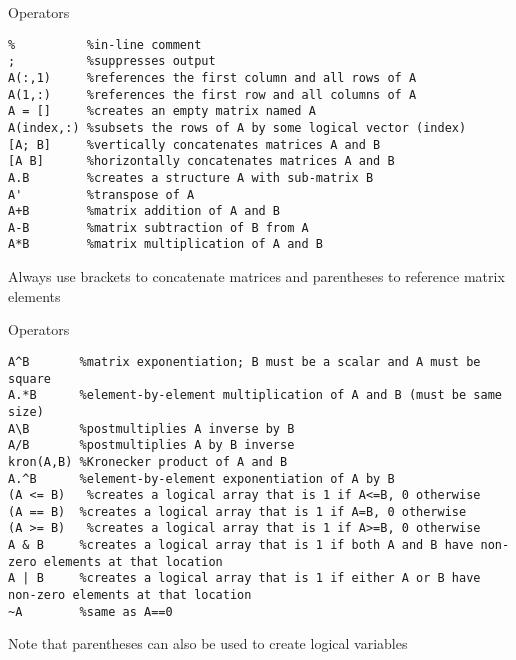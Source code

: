 \documentclass[english,xcolor=dvipsnames]{beamer}
\begin{document}
\begin{frame}[fragile]{Operators}
\begin{lstlisting}
%          %in-line comment
;          %suppresses output
A(:,1)     %references the first column and all rows of A
A(1,:)     %references the first row and all columns of A
A = []     %creates an empty matrix named A
A(index,:) %subsets the rows of A by some logical vector (index)
[A; B]     %vertically concatenates matrices A and B
[A B]      %horizontally concatenates matrices A and B
A.B        %creates a structure A with sub-matrix B
A'         %transpose of A
A+B        %matrix addition of A and B
A-B        %matrix subtraction of B from A
A*B        %matrix multiplication of A and B
\end{lstlisting}
Always use brackets to concatenate matrices and parentheses to reference matrix elements
\end{frame}

\begin{frame}[fragile]{Operators}
\begin{lstlisting}
A^B       %matrix exponentiation; B must be a scalar and A must be square
A.*B      %element-by-element multiplication of A and B (must be same size)
A\B       %postmultiplies A inverse by B
A/B       %postmultiplies A by B inverse
kron(A,B) %Kronecker product of A and B
A.^B      %element-by-element exponentiation of A by B
(A <= B)   %creates a logical array that is 1 if A<=B, 0 otherwise
(A == B)  %creates a logical array that is 1 if A=B, 0 otherwise
(A >= B)   %creates a logical array that is 1 if A>=B, 0 otherwise
A & B     %creates a logical array that is 1 if both A and B have non-zero elements at that location
A | B     %creates a logical array that is 1 if either A or B have non-zero elements at that location
~A        %same as A==0
\end{lstlisting}
Note that parentheses can also be used to create logical variables
\end{frame}
\end{document}
